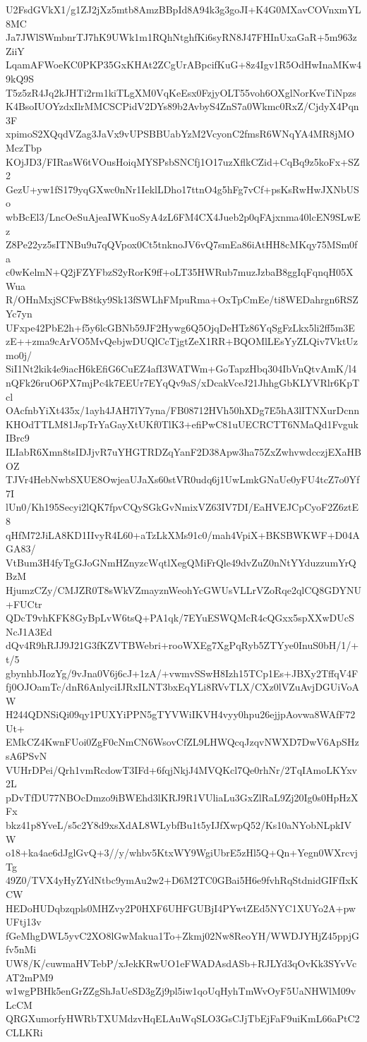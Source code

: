 U2FsdGVkX1/g1ZJ2jXz5mtb8AmzBBpId8A94k3g3goJI+K4G0MXavCOVnxmYL8MC
Ja7JWlSWmbnrTJ7hK9UWk1m1RQhNtghfKi6syRN8J47FHInUxaGaR+5m963zZiiY
LqamAFWoeKC0PKP35GxKHAt2ZCgUrABpcifKuG+8z4Igv1R5OdHwInaMKw49kQ9S
T5z5zR4Jq2kJHTi2rm1kiTLgXM0VqKeEsx0FzjyOLT55voh6OXglNorKveTiNpzs
K4BsoIUOYzdxIlrMMCSCPidV2DYs89b2AvbyS4ZnS7a0Wkmc0RxZ/CjdyX4Pqn3F
xpimoS2XQqdVZag3JaVx9vUPSBBUabYzM2VcyonC2fmsR6WNqYA4MR8jMOMczTbp
KOjJD3/FIRasW6tVOusHoiqMYSPsbSNCfj1O17uzXflkCZid+CqBq9z5koFx+SZ2
GezU+yw1fS179yqGXwc0nNr1IeklLDho17ttnO4g5hFg7vCf+psKsRwHwJXNbUSo
wbBcEl3/LncOeSuAjeaIWKuoSyA4zL6FM4CX4Jueb2p0qFAjxnma40lcEN9SLwEz
Z8Pe22yz5sITNBu9u7qQVpox0Ct5tnknoJV6vQ7smEa86iAtHH8cMKqy75MSm0fa
c0wKelmN+Q2jFZYFbzS2yRorK9ff+oLT35HWRub7muzJzbaB8ggIqFqnqH05XWua
R/OHnMxjSCFwB8tky9Sk13fSWLhFMpuRma+OxTpCmEe/ti8WEDahrgn6RSZYc7yn
UFxpe42PbE2h+f5y6lcGBNb59JF2Hywg6Q5OjqDeHTz86YqSgFzLkx5li2ff5m3E
zE++zma9cArVO5MvQebjwDUQlCcTjgtZeX1RR+BQOMlLEsYyZLQiv7VktUzmo0j/
SiI1Nt2kik4e9iacH6kEfiG6CuEZ4afI3WATWm+GoTapzHbq304IbVnQtvAmK/l4
nQFk26ruO6PX7mjPc4k7EEUr7EYqQv9aS/xDcakVceJ21JhhgGbKLYVRlr6KpTcl
OAcfnbYiXt435x/1ayh4JAH7lY7yna/FB08712HVh50hXDg7E5hA3lITNXurDcnn
KHOdTTLM81JspTrYaGayXtUKf0TlK3+efiPwC81uUECRCTT6NMaQd1FvgukIBrc9
ILIabR6Xmn8tsIDJjvR7uYHGTRDZqYanF2D38Apw3ha75ZxZwhvwdcczjEXaHBOZ
TJVr4HebNwbSXUE8OwjeaUJaXs60stVR0udq6j1UwLmkGNaUe0yFU4tcZ7o0Yf7I
lUn0/Kh195Secyi2lQK7fpvCQySGkGvNmixVZ63IV7DI/EaHVEJCpCyoF2Z6ztE8
qHfM72JiLA8KD1IIvyR4L60+aTzLkXMs91c0/mah4VpiX+BKSBWKWF+D04AGA83/
VtBum3H4fyTgGJoGNmHZnyzcWqtlXegQMiFrQle49dvZuZ0nNtYYduzzumYrQBzM
HjumzCZy/CMJZR0T8sWkVZmayznWeohYcGWUsVLLrVZoRqe2qlCQ8GDYNU+FUCtr
QDcT9vhKFK8GyBpLvW6tsQ+PA1qk/7EYuESWQMcR4cQGxx5spXXwDUcSNcJ1A3Ed
dQv4R9hRJJ9J21G3fKZVTBWebri+rooWXEg7XgPqRyb5ZTYye0InuS0bH/1/+t/5
gbynhbJIozYg/9vJna0V6j6cJ+1zA/+vwmvSSwH8Izh15TCp1Es+JBXy2TffqV4F
fj0OJOamTc/dnR6AnlyciIJRxILNT3bxEqYLi8RVvTLX/CXz0lVZuAvjDGUiVoAW
H244QDNSiQi09qy1PUXYiPPN5gTYVWiIKVH4vyy0hpu26ejjpAovwa8WAfF72Ut+
EMkCZ4KwnFUoi0ZgF0cNmCN6WsovCfZL9LHWQcqJzqvNWXD7DwV6ApSHzsA6PSvN
VUHrDPei/Qrh1vmRcdowT3IFd+6fqjNkjJ4MVQKcl7Qe0rhNr/2TqIAmoLKYxv2L
pDvTfDU77NBOcDmzo9iBWEhd3lKRJ9R1VUliaLu3GxZlRaL9Zj20Ig0s0HpHzXFx
bkz41p8YveL/s5c2Y8d9xsXdAL8WLybfBu1t5yIJfXwpQ52/Ks10aNYobNLpkIVW
o18+ka4ae6dJglGvQ+3//y/whbv5KtxWY9WgiUbrE5zHl5Q+Qn+Yegn0WXrcvjTg
49Z0/TVX4yHyZYdNtbc9ymAu2w2+D6M2TC0GBai5H6e9fvhRqStdnidGIFfIxKCW
HEDoHUDqbzqpls0MHZvy2P0HXF6UHFGUBjI4PYwtZEd5NYC1XUYo2A+pwUFtj13v
fGeMhgDWL5yvC2XO8lGwMakua1To+Zkmj02Nw8ReoYH/WWDJYHjZ45ppjGfv5nMi
UW8/K/cuwmaHVTebP/xJekKRwUO1eFWADAsdASb+RJLYd3qOvKk3SYvVcAT2mPM9
w1wgPBHk5enGrZZgShJaUeSD3gZj9pl5iw1qoUqHyhTmWvOyF5UaNHWlM09vLcCM
QRGXumorfyHWRbTXUMdzvHqELAuWqSLO3GsCJjTbEjFaF9uiKmL66aPtC2CLLKRi
